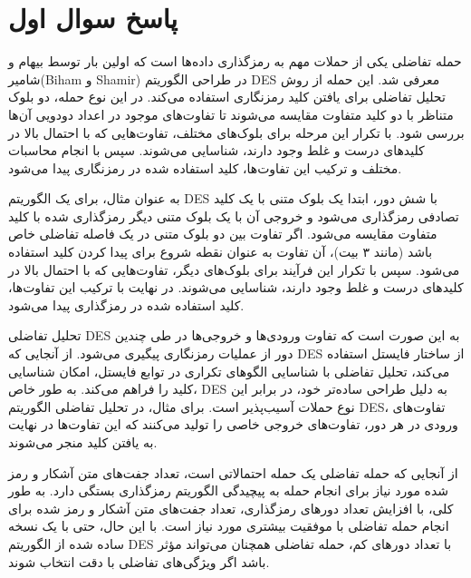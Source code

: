 \section*{پاسخ سوال اول}
حمله تفاضلی یکی از حملات مهم به رمزگذاری داده‌ها است که اولین بار توسط بیهام و شامیر(Biham و Shamir) در طراحی الگوریتم DES معرفی شد. این حمله از روش تحلیل تفاضلی برای یافتن کلید رمزنگاری استفاده می‌کند. در این نوع حمله، دو بلوک متناظر با دو کلید متفاوت مقایسه می‌شوند تا تفاوت‌های موجود در اعداد دودویی آن‌ها بررسی شود. با تکرار این مرحله برای بلوک‌های مختلف، تفاوت‌هایی که با احتمال بالا در کلیدهای درست و غلط وجود دارند، شناسایی می‌شوند. سپس با انجام محاسبات مختلف و ترکیب این تفاوت‌ها، کلید استفاده شده در رمزنگاری پیدا می‌شود.

به عنوان مثال، برای یک الگوریتم DES با شش دور، ابتدا یک بلوک متنی با یک کلید تصادفی رمزگذاری می‌شود و خروجی آن با یک بلوک متنی دیگر رمزگذاری شده با کلید متفاوت مقایسه می‌شود. اگر تفاوت بین دو بلوک متنی در یک فاصله تفاضلی خاص باشد (مانند ۳ بیت)، آن تفاوت به عنوان نقطه شروع برای پیدا کردن کلید استفاده می‌شود. سپس با تکرار این فرآیند برای بلوک‌های دیگر، تفاوت‌هایی که با احتمال بالا در کلیدهای درست و غلط وجود دارند، شناسایی می‌شوند. در نهایت با ترکیب این تفاوت‌ها، کلید استفاده شده در رمزگذاری پیدا می‌شود.

تحلیل تفاضلی DES به این صورت است که تفاوت ورودی‌ها و خروجی‌ها در طی چندین دور از عملیات رمزنگاری پیگیری می‌شود. از آنجایی که DES از ساختار فایستل استفاده می‌کند، تحلیل تفاضلی با شناسایی الگوهای تکراری در توابع فایستل، امکان شناسایی کلید را فراهم می‌کند. به طور خاص، DES به دلیل طراحی ساده‌تر خود، در برابر این نوع حملات آسیب‌پذیر است. برای مثال، در تحلیل تفاضلی الگوریتم DES، تفاوت‌های ورودی در هر دور، تفاوت‌های خروجی خاصی را تولید می‌کنند که این تفاوت‌ها در نهایت به یافتن کلید منجر می‌شوند.

از آنجایی که حمله تفاضلی یک حمله احتمالاتی است، تعداد جفت‌های متن آشکار و رمز شده مورد نیاز برای انجام حمله به پیچیدگی الگوریتم رمزگذاری بستگی دارد. به طور کلی، با افزایش تعداد دورهای رمزگذاری، تعداد جفت‌های متن آشکار و رمز شده برای انجام حمله تفاضلی با موفقیت بیشتری مورد نیاز است. با این حال، حتی با یک نسخه ساده شده از الگوریتم DES با تعداد دورهای کم، حمله تفاضلی همچنان می‌تواند مؤثر باشد اگر ویژگی‌های تفاضلی با دقت انتخاب شوند.

